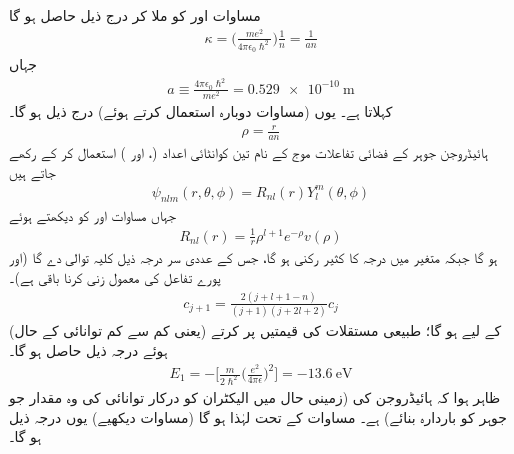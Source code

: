  مساوات   اور  کو ملا کر درج ذیل حاصل ہو گا
\begin{align}
\kappa =\big(\frac{me^{2}}{4\pi\epsilon_{0}\hslash^{2}}\big)\frac{1}{n}=\frac{1}{an} 
\end{align}
جہاں
\begin{align}\label{مساوات_تین_ابعادی_رداس_بوہر}
a\equiv\frac{4\pi\epsilon_{0}\hslash^{2}}{me^{2}}=\SI{0.529e-10}{\meter}
\end{align}
 کہلاتا ہے۔ یوں (مساوات  دوبارہ استعمال کرتے ہوئے) درج ذیل ہو گا۔
\begin{align}
\rho=\frac{r}{an} 
\end{align}
ہائیڈروجن جوہر کے فضائی تفاعلات  موج کے نام تین کوانٹائی اعداد (،  اور ) استعمال کر کے رکھے جاتے ہیں 
 \begin{align}
\psi_{nlm}(r,\theta,\phi)=R_{nl}(r)Y_{l}^{m}(\theta,\phi) 
\end{align}
 جہاں مساوات  اور  کو دیکھتے ہوئے
 \begin{align}
R_{nl}(r)=\frac{1}{r}\rho^{l+1}e^{-\rho}v(\rho) 
\end{align} 
 ہو گا  جبکہ  متغیر  میں درجہ   کا کثیر رکنی ہو گا، جس کے عددی سر  درجہ ذیل کلیہ توالی دے گا (اور پورے تفاعل کی  معمول زنی کرنا   باقی ہے)۔
 \begin{align}\label{مساوات_ابعادی_کلیہ_توالی_کولمب_مخفیہ}
c_{j+1}=\frac{2(j+l+1-n)}{(j+1)(j+2l+2)}c_{j} 
\end{align}
 (یعنی کم سے کم توانائی کے حال)  کے لیے 
  ہو گا؛ طبیعی مستقلات کی  قیمتیں پر کرتے ہوئے درجہ ذیل حاصل ہو گا۔
 \begin{align}\label{مساوات_تین_ابعاد_ہائیڈروجن_بندشی_توانائی}
E_{1}=-\big[\frac{m}{2\hslash^{2}}\big(\frac{e^{2}}{4\pi\epsilon}\big)^{2}\big]=\SI{-13.6}{\electronvolt}
\end{align}
 ظاہر ہوا کہ  ہائیڈروجن کی  (زمینی حال میں الیکٹران کو درکار  توانائی کی وہ مقدار جو جوہر کو باردارہ بنائے)   ہے۔ مساوات  کے تحت   لہٰذا   ہو گا (مساوات  دیکھیے) یوں درجہ ذیل ہو گا۔
